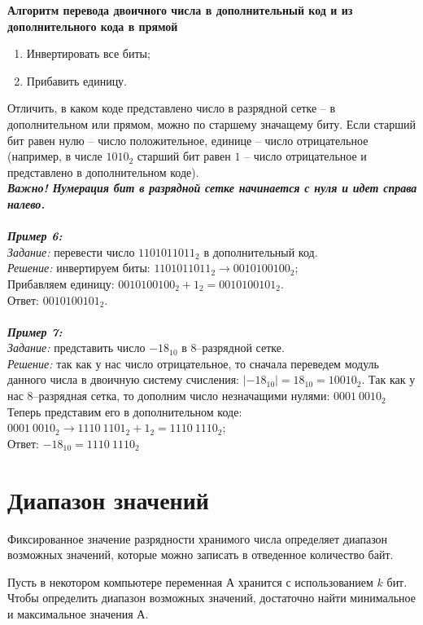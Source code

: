 \begin{center}
  \textbf{Алгоритм перевода двоичного числа в дополнительный код и из дополнительного кода в прямой}
\end{center}
\begin{enumerate}
\item Инвертировать все биты;
\item Прибавить единицу.
\end{enumerate}

Отличить, в каком коде представлено число в разрядной сетке -- в дополнительном или прямом, можно по старшему значащему биту. Если старший бит равен нулю -- число положительное, единице -- число отрицательное (например, в числе $1010_{2}$ старший бит равен $1$ -- число отрицательное и представлено в дополнительном коде).
\\\textbf{\emph{Важно! Нумерация бит в разрядной сетке начинается с нуля и идет справа налево.}}
\\
\\\emph{\textbf{Пример 6:}}
\\\emph{Задание:} перевести число $1101011011_{2}$ в дополнительный код.
\\\emph{Решение:} инвертируем биты: $1101011011_{2} \to 0010100100_{2}$;
\\Прибавляем единицу: $0010100100_{2} + 1_{2} = 0010100101_{2}$.
\\Ответ: $0010100101_{2}$.
\\
\\\emph{\textbf{Пример 7:}}
\\\emph{Задание:} представить число $-18_{10}$ в 8--разрядной сетке.
\\\emph{Решение:} так как у нас число отрицательное, то сначала переведем модуль данного числа в двоичную систему счисления: $|-18_{10}| = 18_{10} = 10010_{2}$.
Так как у нас 8--разрядная сетка, то дополним число незначащими нулями: $0001\ 0010_{2}$
Теперь представим его в дополнительном коде: $0001\ 0010_{2} \to 1110\ 1101_{2} + 1_{2} = 1110\ 1110_{2}$;\\
Ответ: $-18_{10} = 1110\ 1110_{2}$

\section{Диапазон значений}
Фиксированное значение разрядности хранимого числа определяет диапазон возможных значений, которые можно записать в отведенное количество байт.

Пусть в некотором компьютере переменная А хранится с использованием $k$ бит. Чтобы определить диапазон возможных значений, достаточно найти минимальное и максимальное значения А. 

